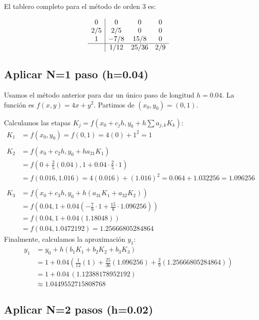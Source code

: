 \documentclass{article}
\begin{document}
El tablero completo para el método de orden 3 es:

$$
\begin{array}{c|ccc}
0 & 0 & 0 & 0 \\
2/5 & 2/5 & 0 & 0 \\
1 & -7/8 & 15/8 & 0 \\
\hline
& 1/12 & 25/36 & 2/9
\end{array}
$$

\subsection{Aplicar N=1 paso (h=0.04)}

Usamos el método anterior para dar un único paso de longitud $h=0.04$.
La función es $f(x,y) = 4x + y^2$. Partimos de $(x_0, y_0) = (0, 1)$.

Calculamos las etapas $K_j=f(x_0+c_j h, y_0+h\sum a_{j,k}K_k)$:
\begin{align*}
    K_1 &= f(x_0, y_0) = f(0, 1) = 4(0) + 1^2 = \boxed{1} \\ \\
    K_2 &= f(x_0 + c_2 h, y_0 + h a_{21} K_1) \\
        &= f(0 + \frac{2}{5}(0.04), 1 + 0.04 \cdot \frac{2}{5} \cdot 1) \\
        &= f(0.016, 1.016) = 4(0.016) + (1.016)^2 = 0.064 + 1.032256 = \boxed{1.096256} \\ \\
    K_3 &= f(x_0 + c_3 h, y_0 + h(a_{31}K_1 + a_{32}K_2)) \\
        &= f(0.04, 1 + 0.04(-\frac{7}{8} \cdot 1 + \frac{15}{8} \cdot 1.096256)) \\
        &= f(0.04, 1 + 0.04(1.18048)) \\
        &= f(0.04, 1.0472192) = \boxed{1.25666805284864}
\end{align*}
Finalmente, calculamos la aproximación $y_1$:
\begin{align*}
    y_1 &= y_0 + h(b_1 K_1 + b_2 K_2 + b_3 K_3) \\
        &= 1 + 0.04 \left( \frac{1}{12}(1) + \frac{25}{36}(1.096256) + \frac{2}{9}(1.25666805284864) \right) \\
        &= 1 + 0.04\,(1.12388178952192) \\
        &\approx 1.0449552715808768
\end{align*}

\subsection{Aplicar N=2 pasos (h=0.02)}
\end{document}
